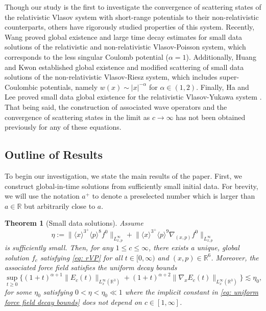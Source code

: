 \documentclass[reqno, 11pt, letterpaper]{amsart}
\newtheorem{theorem}{Theorem}
\theoremstyle{remark}
\numberwithin{equation}{section}
\numberwithin{theorem}{section}
\numberwithin{table}{section}
\numberwithin{figure}{section}
\begin{document}
Though our study is the first to investigate the convergence of scattering states of the relativistic Vlasov system with short-range potentials to their non-relativistic counterparts, others have rigorously studied properties of this system. Recently, Wang \cite{Wang23} proved global existence and large time decay estimates for small data solutions of the relativistic and non-relativistic Vlasov-Poisson system, which corresponds to the less singular Coulomb potential ($\alpha = 1$).
Additionally, Huang and Kwon established global existence and modified 
scattering of small data solutions of the non-relativistic Vlasov-Riesz system, which includes super-Coulombic potentials, namely $w(x) \sim |x|^{-\alpha}$ for $\alpha \in (1,2)$.
Finally, Ha and Lee proved small data global existence for the relativistic Vlasov-Yukawa system \cite{HaLee}.
That being said, the construction of associated wave operators and the convergence of scattering states in the limit as $c \to \infty$ has not been obtained previously for any of these equations.


\subsection{Outline of Results}
To begin our investigation, we state the main results of the paper. First, we construct global-in-time solutions from sufficiently small initial data.
For brevity, we will use the notation $a^+$ to denote a preselected number which is larger than $a \in \mathbb{R}$ but arbitrarily close to $a$.
\begin{theorem}[Small data solutions]
\label{T1}
Assume
\begin{equation}\label{eq: initial data assumption}
\eta:=\Big\|\langle x\rangle^{3^+}\langle p \rangle^8 f^0\Big\|_{L_{x,p}^\infty} +\Big\|\langle x\rangle^{3^+}\langle p \rangle^9\nabla_{(x,p)}f^0\Big\|_{L_{x,p}^\infty}
\end{equation}
is sufficiently small. Then, for any $1 \leq c \leq \infty$, there exists a unique, global solution $f_c$ satisfying \eqref{eq: rVP} for all $t \in [0,\infty)$ and $(x,p) \in \mathbb{R}^6$. Moreover, the associated force field satisfies the uniform decay bounds
\begin{equation}\label{eq: uniform force field decay bounds}
\sup_{t\geq0}\Big\{(1+t)^{\alpha+1}\|E_c(t)\|_{L_x^\infty(\mathbb{R}^3)}+(1+t)^{\alpha+2}\|\nabla_x E_c(t)\|_{L_x^\infty(\mathbb{R}^3)}\Big\}\lesssim\eta_0,
\end{equation}
for some $\eta_0$ satisfying $0 < \eta < \eta_0 \ll 1$ where the implicit constant in \eqref{eq: uniform force field decay bounds} does not depend on $c\in [1,\infty]$.
\end{theorem}
\end{document}
